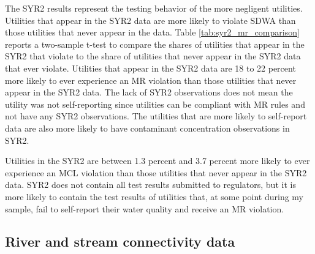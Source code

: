 \documentclass[12pt]{article}
\begin{document}


The SYR2 results represent the testing behavior of the more negligent utilities. Utilities that appear in the SYR2 data are more likely to violate SDWA than those utilities that never appear in the data. Table \ref{tab:syr2_mr_comparison} reports a two-sample t-test to compare the shares of utilities that appear in the SYR2 that violate to the share of utilities that never appear in the SYR2 data that ever violate. Utilities that appear in the SYR2 data are 18 to 22 percent more likely to ever experience an MR violation than those utilities that never appear in the SYR2 data. The lack of SYR2 observations does not mean the utility was not self-reporting since utilities can be compliant with MR rules and not have any SYR2 observations. The utilities that are more likely to self-report data are also more likely to have contaminant concentration observations in SYR2. 

Utilities in the SYR2 are between 1.3 percent and 3.7 percent more likely to ever experience an MCL violation than those utilities that never appear in the SYR2 data. SYR2 does not contain all test results submitted to regulators, but it is more likely to contain the test results of utilities that, at some point during my sample, fail to self-report their water quality and receive an MR violation.



\subsection{River and stream connectivity data}
\end{document}
